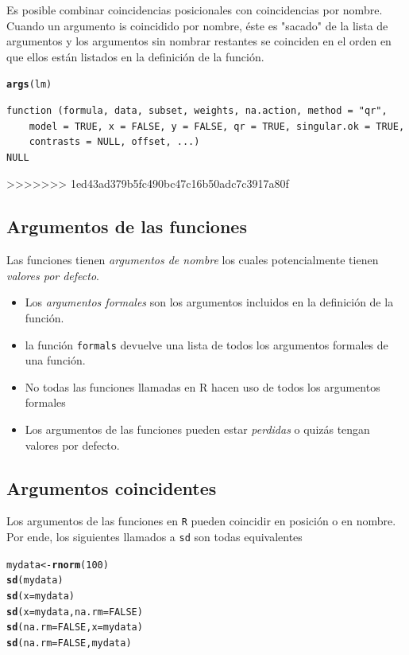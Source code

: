 \documentclass{article}\usepackage[]{graphicx}\usepackage[]{color}
\makeatletter
\newcommand{\hlnum}[1]{\textcolor[rgb]{0.686,0.059,0.569}{#1}}%
\newcommand{\hlstd}[1]{\textcolor[rgb]{0.345,0.345,0.345}{#1}}%
\newcommand{\hlkwb}[1]{\textcolor[rgb]{0.69,0.353,0.396}{#1}}%
\newcommand{\hlkwc}[1]{\textcolor[rgb]{0.333,0.667,0.333}{#1}}%
\newcommand{\hlkwd}[1]{\textcolor[rgb]{0.737,0.353,0.396}{\textbf{#1}}}%
\newenvironment{kframe}{%
 \def\at@end@of@kframe{}%
 \ifinner\ifhmode%
  \def\at@end@of@kframe{\end{minipage}}%
  \begin{minipage}{\columnwidth}%
 \fi\fi%
 \def\FrameCommand##1{\hskip\@totalleftmargin \hskip-\fboxsep
 \colorbox{shadecolor}{##1}\hskip-\fboxsep
     \hskip-\linewidth \hskip-\@totalleftmargin \hskip\columnwidth}%
 \MakeFramed {\advance\hsize-\width
   \@totalleftmargin\z@ \linewidth\hsize
   \@setminipage}}%
 {\par\unskip\endMakeFramed%
 \at@end@of@kframe}
\newenvironment{knitrout}{}{} %
\makeatother
\begin{document}
Es posible combinar coincidencias posicionales con coincidencias por nombre. Cuando un argumento is coincidido por nombre, éste es "sacado" de la lista de argumentos y los argumentos sin nombrar restantes se coinciden en el orden en que ellos están listados en la definición de la función.
\begin{knitrout}
\color{fgcolor}\begin{kframe}
\begin{alltt}
  \hlkwd{args}\hlstd{(lm)}
\end{alltt}
\begin{verbatim}
function (formula, data, subset, weights, na.action, method = "qr", 
    model = TRUE, x = FALSE, y = FALSE, qr = TRUE, singular.ok = TRUE, 
    contrasts = NULL, offset, ...) 
NULL
\end{verbatim}
\end{kframe}
\end{knitrout}
>>>>>>> 1ed43ad379b5fc490bc47c16b50adc7c3917a80f

  \subsection{Argumentos de las funciones}
  Las funciones tienen \emph{argumentos de nombre} los cuales potencialmente tienen \emph{valores por defecto}.
  \begin{itemize}
    \item Los \emph{argumentos formales} son los argumentos incluidos en la definición de la función.
    \item la función \texttt{formals} devuelve una lista de todos los argumentos formales de una función.
    \item No todas las funciones llamadas en R hacen uso de todos los argumentos formales
    \item Los argumentos de las funciones pueden estar \emph{perdidas} o quizás tengan valores por defecto.
  \end{itemize}
  
  \subsection{Argumentos coincidentes}
  Los argumentos de las funciones en \texttt{R} pueden coincidir en posición o en nombre. Por ende, los siguientes llamados a \texttt{sd} son todas equivalentes
\begin{knitrout}
\color{fgcolor}\begin{kframe}
\begin{alltt}
  \hlstd{mydata} \hlkwb{<-} \hlkwd{rnorm}\hlstd{(}\hlnum{100}\hlstd{)}
  \hlkwd{sd}\hlstd{(mydata)}
  \hlkwd{sd}\hlstd{(}\hlkwc{x} \hlstd{= mydata)}
  \hlkwd{sd}\hlstd{(}\hlkwc{x} \hlstd{= mydata,} \hlkwc{na.rm} \hlstd{=} \hlnum{FALSE}\hlstd{)}
  \hlkwd{sd}\hlstd{(}\hlkwc{na.rm} \hlstd{=} \hlnum{FALSE}\hlstd{,} \hlkwc{x} \hlstd{= mydata)}
  \hlkwd{sd}\hlstd{(}\hlkwc{na.rm} \hlstd{=} \hlnum{FALSE}\hlstd{, mydata)}
\end{alltt}
\end{kframe}
\end{knitrout}
  
\end{document}
